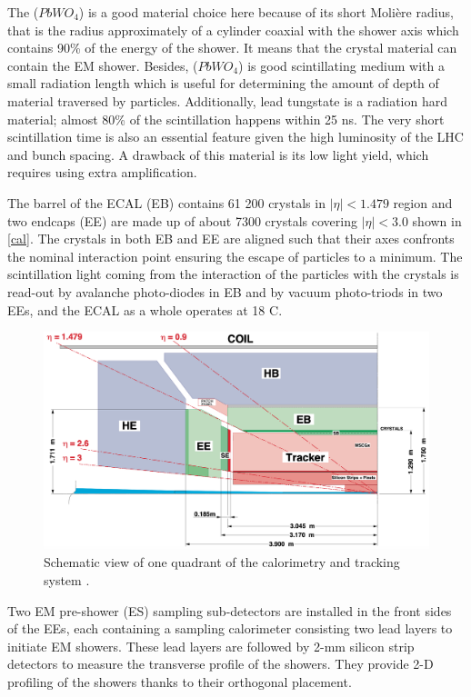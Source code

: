 The ($PbWO_4$) is a good material choice here because of its short Moli\`ere radius, that is the radius approximately of a cylinder coaxial with the shower axis which contains 90\% of the energy of the shower. It means that the crystal material can contain the EM shower. Besides, ($PbWO_4$) is good scintillating medium with a small radiation length which is useful for determining the amount of depth of material traversed by particles. Additionally, lead tungstate is a radiation hard material; almost 80\% of the scintillation happens within 25 ns. The very short scintillation time is also an essential feature given the high luminosity of the LHC and bunch spacing. A drawback of this material is its low light yield, which requires using extra amplification.

The barrel of the ECAL (EB) contains 61 200 crystals in $|\eta|<1.479$ region and two endcaps (EE) are made up of about 7300 crystals covering $|\eta|<3.0$ shown in \autoref{cal}. The crystals in both EB and EE are aligned such that their axes confronts the nominal interaction point ensuring the escape of particles to a minimum. The scintillation light coming from the interaction of the particles with the crystals is read-out by avalanche photo-diodes in EB and by vacuum photo-triods in two EEs, and the ECAL as a whole operates at 18 \textdegree C.

\begin{figure}[ht]
	\centering
	\includegraphics[width=\textwidth]{MSc_Thesis/fig/cal.png}
	\vspace{2mm}
	\caption[Schematic view showing one quadrant of the calorimetry and tracking system.]{Schematic view of one quadrant of the calorimetry and tracking system \cite{CERN-LHCC-97-033}.}
	\label{cal}
\end{figure}

Two EM pre-shower (ES) sampling sub-detectors are installed in the front sides of the EEs, each containing a sampling calorimeter consisting two lead layers to initiate EM showers. These lead layers are followed by 2-mm silicon strip detectors to measure the transverse profile of the showers. They provide 2-D profiling of the showers thanks to their orthogonal placement.


